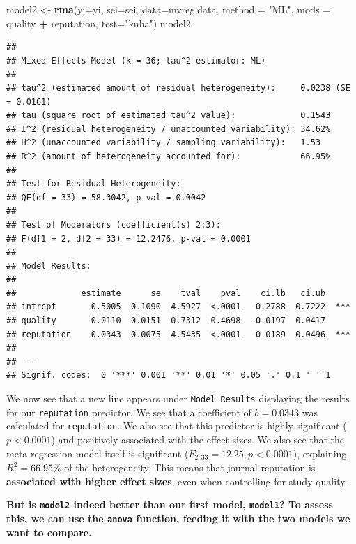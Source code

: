 \documentclass[]{book}
\newenvironment{Shaded}{\begin{snugshade}}{\end{snugshade}}
\newcommand{\DataTypeTok}[1]{\textcolor[rgb]{0.13,0.29,0.53}{#1}}
\newcommand{\KeywordTok}[1]{\textcolor[rgb]{0.13,0.29,0.53}{\textbf{#1}}}
\newcommand{\NormalTok}[1]{#1}
\newcommand{\OperatorTok}[1]{\textcolor[rgb]{0.81,0.36,0.00}{\textbf{#1}}}
\newcommand{\StringTok}[1]{\textcolor[rgb]{0.31,0.60,0.02}{#1}}
\begin{document}
\begin{Shaded}
\begin{Highlighting}[]
\NormalTok{model2 <-}\StringTok{ }\KeywordTok{rma}\NormalTok{(}\DataTypeTok{yi=}\NormalTok{yi, }
              \DataTypeTok{sei=}\NormalTok{sei, }
              \DataTypeTok{data=}\NormalTok{mvreg.data, }
              \DataTypeTok{method =} \StringTok{"ML"}\NormalTok{, }
              \DataTypeTok{mods =} \OperatorTok{~}\StringTok{ }\NormalTok{quality }\OperatorTok{+}\StringTok{ }\NormalTok{reputation, }
              \DataTypeTok{test=}\StringTok{"knha"}\NormalTok{)}
\NormalTok{model2}
\end{Highlighting}
\end{Shaded}

\begin{verbatim}
## 
## Mixed-Effects Model (k = 36; tau^2 estimator: ML)
## 
## tau^2 (estimated amount of residual heterogeneity):     0.0238 (SE = 0.0161)
## tau (square root of estimated tau^2 value):             0.1543
## I^2 (residual heterogeneity / unaccounted variability): 34.62%
## H^2 (unaccounted variability / sampling variability):   1.53
## R^2 (amount of heterogeneity accounted for):            66.95%
## 
## Test for Residual Heterogeneity: 
## QE(df = 33) = 58.3042, p-val = 0.0042
## 
## Test of Moderators (coefficient(s) 2:3): 
## F(df1 = 2, df2 = 33) = 12.2476, p-val = 0.0001
## 
## Model Results:
## 
##             estimate      se    tval    pval    ci.lb   ci.ub     
## intrcpt       0.5005  0.1090  4.5927  <.0001   0.2788  0.7222  ***
## quality       0.0110  0.0151  0.7312  0.4698  -0.0197  0.0417     
## reputation    0.0343  0.0075  4.5435  <.0001   0.0189  0.0496  ***
## 
## ---
## Signif. codes:  0 '***' 0.001 '**' 0.01 '*' 0.05 '.' 0.1 ' ' 1
\end{verbatim}

We now see that a new line appears under \texttt{Model\ Results} displaying the results for our \texttt{reputation} predictor. We see that a coefficient of \(b=0.0343\) was calculated for \texttt{reputation}. We also see that this predictor is highly significant (\(p<0.0001\)) and positively associated with the effect sizes. We also see that the meta-regression model itself is significant (\(F_{2,33}=12.25, p<0.0001\)), explaining \(R^2=66.95\%\) of the heterogeneity. This means that journal reputation is \textbf{associated with higher effect sizes}, even when controlling for study quality.

\textbf{But is \texttt{model2} indeed better than our first model, \texttt{model1}? To assess this, we can use the \texttt{anova} function, feeding it with the two models we want to compare.}
\end{document}
